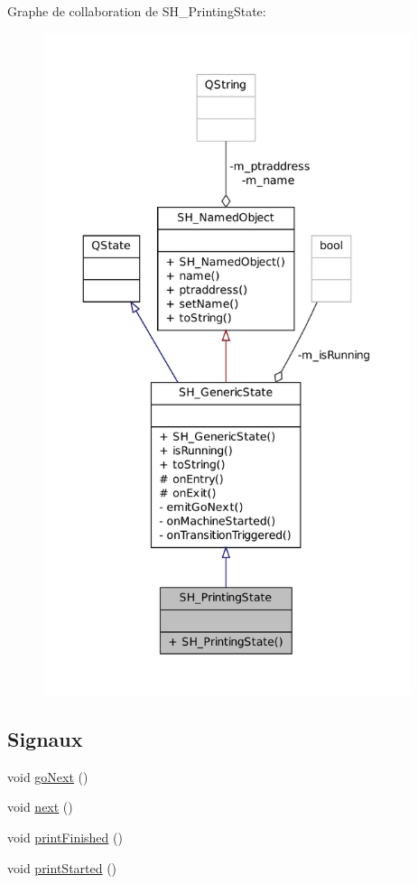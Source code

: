 Graphe de collaboration de S\-H\-\_\-\-Printing\-State\-:
\nopagebreak
\begin{figure}[H]
\begin{center}
\leavevmode
\includegraphics[height=550pt]{classSH__PrintingState__coll__graph}
\end{center}
\end{figure}
\subsection*{Signaux}
\begin{DoxyCompactItemize}
\item 
void \hyperlink{classSH__GenericState_a34c1bebc765cc3a62d66c94c37d4f0c3}{go\-Next} ()
\item 
void \hyperlink{classSH__GenericState_ad5e2a1f3dc129336c8f529cf897c2eb0}{next} ()
\item 
void \hyperlink{classSH__PrintingState_a2d3819c50a51e825ca27b2d320af4828}{print\-Finished} ()
\item 
void \hyperlink{classSH__PrintingState_a59679f51ced1c4a956e752999526d7fe}{print\-Started} ()
\end{DoxyCompactItemize}
